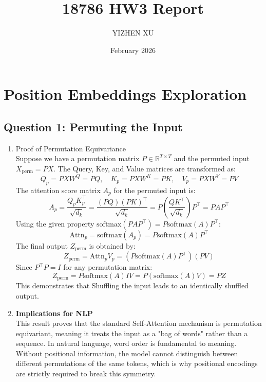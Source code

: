 \documentclass{article}
\title{18786 HW3 Report}
\author{YIZHEN XU}
\date{February 2026}
\begin{document}
\maketitle

\section{Position Embeddings Exploration}

\subsection*{Question 1: Permuting the Input}

\begin{enumerate}
    \item[i.] Proof of Permutation Equivariance \\
    Suppose we have a permutation matrix $P \in \mathbb{R}^{T \times T}$ and the permuted input $X_{\text{perm}} = PX$. The Query, Key, and Value matrices are transformed as:
    \begin{equation}
        Q_p = PXW^Q = PQ, \quad K_p = PXW^K = PK, \quad V_p = PXW^V = PV
    \end{equation}
    The attention score matrix $A_p$ for the permuted input is:
    \begin{equation}
        A_p = \frac{Q_p K_p^\top}{\sqrt{d_k}} = \frac{(PQ)(PK)^\top}{\sqrt{d_k}} = P \left( \frac{QK^\top}{\sqrt{d_k}} \right) P^\top = PAP^\top
    \end{equation}
    Using the given property $\text{softmax}(PAP^\top) = P \text{softmax}(A) P^\top$:
    \begin{equation}
        \text{Attn}_{p} = \text{softmax}(A_p) = P \text{softmax}(A) P^\top
    \end{equation}
    The final output $Z_{\text{perm}}$ is obtained by:
    \begin{equation}
        Z_{\text{perm}} = \text{Attn}_{p} V_p = (P \text{softmax}(A) P^\top)(PV)
    \end{equation}
    Since $P^\top P = I$ for any permutation matrix:
    \begin{equation}
        Z_{\text{perm}} = P \text{softmax}(A) I V = P (\text{softmax}(A)V) = PZ
    \end{equation}
    This demonstrates that Shuffling the input leads to an identically shuffled output.

    \item[ii.] \textbf{Implications for NLP} \\
    This result proves that the standard Self-Attention mechanism is permutation equivariant, meaning it treats the input as a "bag of words" rather than a sequence. In natural language, word order is fundamental to meaning. Without positional information, the model cannot distinguish between different permutations of the same tokens, which is why positional encodings are strictly required to break this symmetry.
\end{enumerate}
\end{document}
